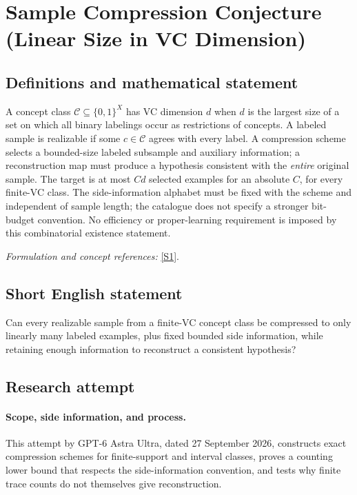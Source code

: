 \documentclass[11pt]{article}
\begin{document}
\section*{\texorpdfstring{Sample Compression Conjecture (Linear Size in VC Dimension)}{Sample Compression Conjecture (Linear Size in VC Dimension)}}\label{293}
\subsection{Definitions and mathematical statement}
A concept class $\mathcal C\subseteq\{0,1\}^X$ has VC dimension $d$ when $d$ is the largest size of a set on which all binary labelings occur as restrictions of concepts. A labeled sample is realizable if some $c\in\mathcal C$ agrees with every label. A compression scheme selects a bounded-size labeled subsample and auxiliary information; a reconstruction map must produce a hypothesis consistent with the \emph{entire} original sample. The target is at most $Cd$ selected examples for an absolute $C$, for every finite-VC class. The side-information alphabet must be fixed with the scheme and independent of sample length; the catalogue does not specify a stronger bit-budget convention. No efficiency or proper-learning requirement is imposed by this combinatorial existence statement.
\par\smallskip\textit{Formulation and concept references:} \href{https://arxiv.org/html/2410.13012v1}{[S1]}.

\subsection{Short English statement}
Can every realizable sample from a finite-VC concept class be compressed to only linearly many labeled examples, plus fixed bounded side information, while retaining enough information to reconstruct a consistent hypothesis?
\subsection{Research attempt}
\paragraph{Scope, side information, and process.}
This attempt by GPT-6 Astra Ultra, dated 27 September 2026, constructs exact compression schemes for finite-support and interval classes, proves a counting lower bound that respects the side-information convention, and tests why finite trace counts do not themselves give reconstruction.
\end{document}

